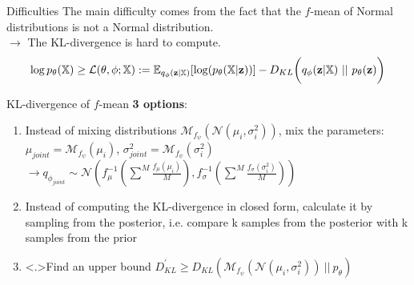\begin{frame}{Difficulties}
    The main difficulty comes from the fact that the $f$-mean of Normal distributions is not a Normal distribution.\\
    $\rightarrow$ The KL-divergence is hard to compute.\\
    \begin{equation*}
        \log p_{\theta}(\mathbb{X}) \geq \mathcal{L}(\theta, \phi; \xset):= \mathbb{E}_{q_{\phi}(\textbf{z}|\mathbb{X})}[\log (p_{\theta}(\mathbb{X}|\textbf{z}))] - D_{KL}\biggl(  q_{\phi}(\textbf{z}|\mathbb{X})\ ||\ p_{\theta}(\textbf{z})\biggr)
    \end{equation*}
\end{frame}

\begin{frame}{KL-divergence of $f$-mean}
    \textbf{3 options}:

    \begin{enumerate}[<+->]
        \item Instead of mixing distributions $\mathcal{M}_{f_{\psi}}(\mathcal{N}(\mu _i, \sigma_i^2))$, mix the parameters:\\
        $\mu_{joint} = \mathcal{M}_{f_{\psi}}(\mu _i)$, $\sigma_{joint}^2 = \mathcal{M}_{f_{\psi}}( \sigma_i^2)$ $\rightarrow q_{\phi_{joint}} \sim \mathcal{N}\left(  f_{\mu}^{-1}(\sum ^M \frac{f_{\mu}(\mu_i)}{M}),f_{\sigma}^{-1}(\sum ^M \frac{f_{\sigma}(\sigma_i^2)}{M})\right)$
        \item Instead of computing the KL-divergence in closed form, calculate it by sampling from the posterior, i.e. compare k samples from the posterior with k samples from the prior
        \item \only<.>{Find an upper bound $ D^{\prime}_{KL} \geq D_{KL}(\mathcal{M}_{f_{\psi}}(\mathcal{N}(\mu _i, \sigma_i^2))\ ||\  p_{\theta})$}

    \end{enumerate}
\end{frame}

